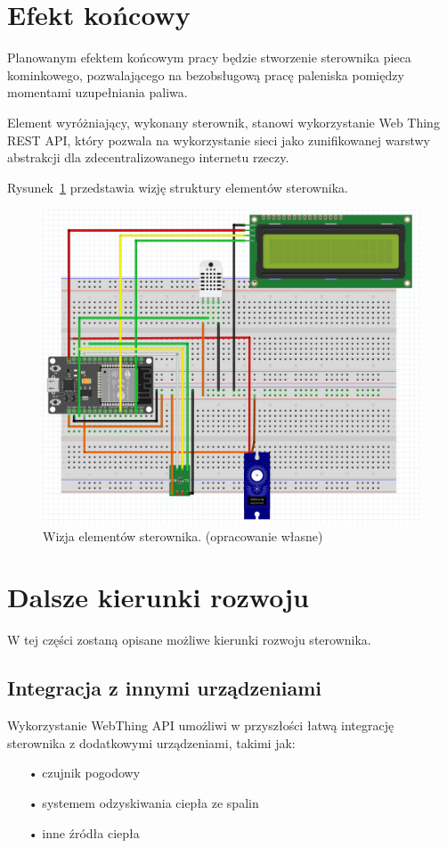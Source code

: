 \documentclass[11pt]{report}
\begin{document}
 \section{Efekt końcowy}
 Planowanym efektem końcowym pracy będzie stworzenie sterownika pieca kominkowego, pozwalającego na bezobsługową pracę paleniska pomiędzy momentami uzupełniania paliwa.

 Element wyróżniający, wykonany sterownik, stanowi wykorzystanie Web Thing REST API, który pozwala na wykorzystanie sieci jako zunifikowanej warstwy abstrakcji dla zdecentralizowanego internetu rzeczy.
 
 Rysunek~\ref{fig:wizja} przedstawia wizję struktury elementów sterownika.
 \begin{figure}[ht]
\centering
\includegraphics[width=0.8 \textwidth]{fig/fritzing_bredboard_v1.png}
\caption{Wizja elementów sterownika. (opracowanie własne)}
\label{fig:wizja}
\end{figure}
 
 \section{Dalsze kierunki rozwoju}
 W tej części zostaną opisane możliwe kierunki rozwoju sterownika.
 \subsection{Integracja z innymi urządzeniami}
 Wykorzystanie WebThing API umożliwi w przyszłości łatwą integrację sterownika z dodatkowymi urządzeniami, takimi jak:
 \begin{enumerate}
 \item[•] czujnik pogodowy
 \item[•] systemem odzyskiwania ciepła ze spalin
 \item[•] inne źródła ciepła
 \end{enumerate}
\end{document}
